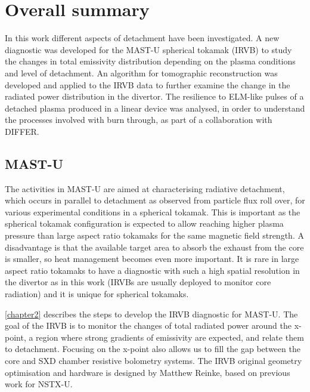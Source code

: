 
\chapter{Overall summary}\label{chapter3.9}


In this work different aspects of detachment have been investigated. A new diagnostic was developed for the MAST-U spherical tokamak (IRVB) to study the changes in total emissivity distribution depending on the plasma conditions and level of detachment. An algorithm for tomographic reconstruction was developed and applied to the IRVB data to further examine the change in the radiated power distribution in the divertor. The resilience to ELM-like pulses of a detached plasma produced in a linear device was analysed, in order to understand the processes involved with burn through, as part of a collaboration with DIFFER.

\section{MAST-U}



The activities in MAST-U are aimed at characterising radiative detachment, which occurs in parallel to detachment as observed from particle flux roll over, for various experimental conditions in a spherical tokamak. This is important as the spherical tokamak configuration is expected to allow reaching higher plasma pressure than large aspect ratio tokamaks for the same magnetic field strength. A disadvantage is that the available target area to absorb the exhaust from the core is smaller, so heat management becomes even more important. It is rare in large aspect ratio tokamaks to have a diagnostic with such a high spatial resolution in the divertor as in this work (IRVBs are usually deployed to monitor core radiation) and it is unique for spherical tokamaks.



\autoref{chapter2} describes the steps to develop the IRVB diagnostic for MAST-U. The goal of the IRVB is to monitor the changes of total radiated power around the x-point, a region where strong gradients of emissivity are expected, and relate them to detachment. Focusing on the x-point also allows us to fill the gap between the core and SXD chamber resistive bolometry systems. The IRVB original geometry optimisation and hardware is designed by Matthew Reinke, based on previous work for NSTX-U. \cite{VanEden2016}

